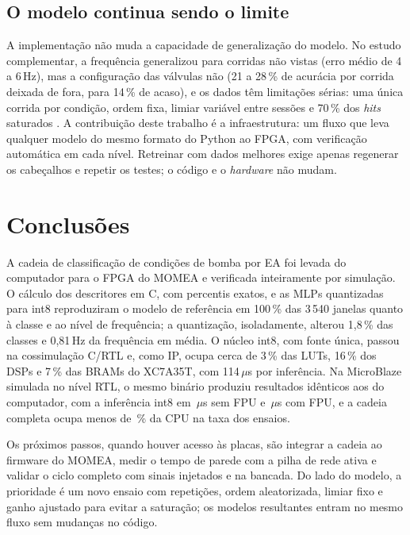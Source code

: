 \documentclass[12pt]{article}
\begin{document}
\subsection{O modelo continua sendo o limite}

A implementação não muda a capacidade de generalização do modelo. No estudo complementar, a frequência generalizou para corridas não vistas (erro médio de 4 a 6\,Hz), mas a configuração das válvulas não (21 a 28\,\% de acurácia por corrida deixada de fora, para 14\,\% de acaso), e os dados têm limitações sérias: uma única corrida por condição, ordem fixa, limiar variável entre sessões e 70\,\% dos \textit{hits} saturados \cite{mlpbomba2026}. A contribuição deste trabalho é a infraestrutura: um fluxo que leva qualquer modelo do mesmo formato do Python ao FPGA, com verificação automática em cada nível. Retreinar com dados melhores exige apenas regenerar os cabeçalhos e repetir os testes; o código e o \textit{hardware} não mudam.

\section{Conclusões}
\label{sec:conclusoes}

A cadeia de classificação de condições de bomba por EA foi levada do computador para o FPGA do MOMEA e verificada inteiramente por simulação. O cálculo dos descritores em C, com percentis exatos, e as MLPs quantizadas para int8 reproduziram o modelo de referência em 100\,\% das 3\,540 janelas quanto à classe e ao nível de frequência; a quantização, isoladamente, alterou 1,8\,\% das classes e 0,81\,Hz da frequência em média. O núcleo int8, com fonte única, passou na cossimulação C/RTL e, como IP, ocupa cerca de 3\,\% das LUTs, 16\,\% dos DSPs e 7\,\% das BRAMs do XC7A35T, com 114\,\(\mu\)s por inferência. Na MicroBlaze simulada no nível RTL, o mesmo binário produziu resultados idênticos aos do computador, com a inferência int8 em \mbMlpIntSoftUs\,\(\mu\)s sem FPU e \mbMlpIntFpuUs\,\(\mu\)s com FPU, e a cadeia completa ocupa menos de \mbCargaEnsaioMax\,\% da CPU na taxa dos ensaios.

Os próximos passos, quando houver acesso às placas, são integrar a cadeia ao firmware do MOMEA, medir o tempo de parede com a pilha de rede ativa e validar o ciclo completo com sinais injetados e na bancada. Do lado do modelo, a prioridade é um novo ensaio com repetições, ordem aleatorizada, limiar fixo e ganho ajustado para evitar a saturação; os modelos resultantes entram no mesmo fluxo sem mudanças no código.
\end{document}
